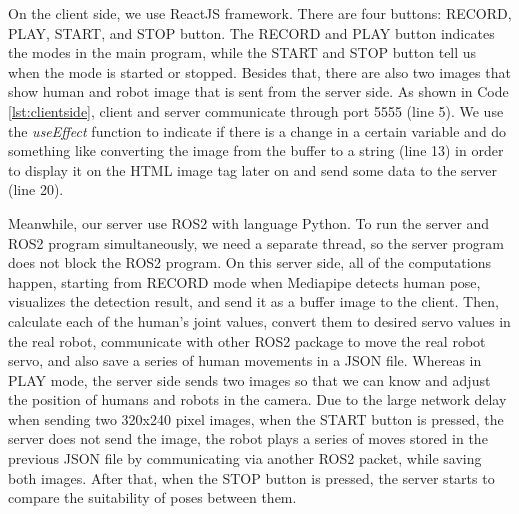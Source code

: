 On the client side, we use ReactJS framework. There are four buttons: RECORD, PLAY, START, and STOP button. The RECORD and PLAY button indicates the modes in the main program, while the START and STOP button tell us when the mode is started or stopped.
Besides that, there are also two images that show human and robot image that is sent from the server side. As shown in Code \ref{lst:clientside}, client and server communicate through port 5555 (line 5).
We use the \emph{useEffect} function to indicate if there is a change in a certain variable and do something like converting the image from the buffer to a string (line 13) in order to display it on the HTML image tag later on and send some data to the server (line 20).



Meanwhile, our server use ROS2 with language Python. To run the server and ROS2 program simultaneously, we need a separate thread, so the server program does not block the ROS2 program.
On this server side, all of the computations happen, starting from RECORD mode when Mediapipe detects human pose, visualizes the detection result, and send it as a buffer image to the client.
Then, calculate each of the human's joint values, convert them to desired servo values in the real robot, communicate with other ROS2 package to move the real robot servo, and also save a series of human movements in a JSON file.
Whereas in PLAY mode, the server side sends two images so that we can know and adjust the position of humans and robots in the camera. Due to the large network delay when sending two 320x240 pixel images, when the START button is pressed,
the server does not send the image, the robot plays a series of moves stored in the previous JSON file by communicating via another ROS2 packet, while saving both images. After that, when the STOP button is pressed, the server starts to compare the suitability of poses between them.